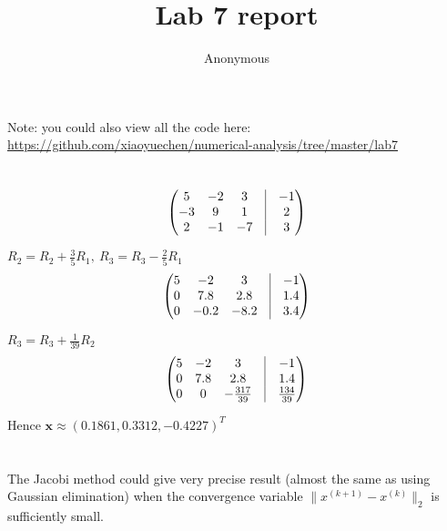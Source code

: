 \documentclass{article}
\title{Lab 7 report}
\author{Anonymous}
\begin{document}
\maketitle

Note: you could also view all the code here:\\
\url{https://github.com/xiaoyuechen/numerical-analysis/tree/master/lab7}

\section{}
\begin{equation*}
	\begin{pmatrix}
		5  & -2 & 3  & \vline & -1 \\
		-3 & 9  & 1  & \vline & 2  \\
		2  & -1 & -7 & \vline & 3
	\end{pmatrix}
\end{equation*}

$R_2 = R_2 + \frac{3}{5}R_1,~ R_3 = R_3 - \frac{2}{5}R_1$
\begin{equation*}
	\begin{pmatrix}
		5 & -2   & 3    & \vline & -1  \\
		0 & 7.8  & 2.8  & \vline & 1.4 \\
		0 & -0.2 & -8.2 & \vline & 3.4
	\end{pmatrix}
\end{equation*}

$R_3 = R_3 + \frac{1}{39}R_2$
\begin{equation*}
	\begin{pmatrix}
		5 & -2  & 3               & \vline & -1             \\
		0 & 7.8 & 2.8             & \vline & 1.4            \\
		0 & 0   & -\frac{317}{39} & \vline & \frac{134}{39}
	\end{pmatrix}
\end{equation*}

Hence $\boldsymbol{x}\approx(0.1861,0.3312,-0.4227)^T$

\section{}


\section{}
The Jacobi method could give very precise result (almost the same as using
Gaussian elimination) when the convergence variable $\|x^{(k+1)}-x^{(k)}\|_2$ is
sufficiently small.

\section{}

\end{document}
